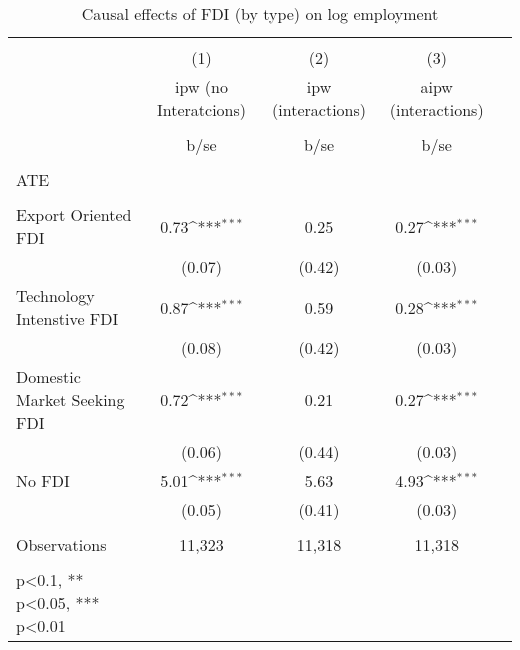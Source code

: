\begin{table}
	\def\sym#1{\ifmmode^{#1}\else\(^{#1}\)\fi}
	\caption{Causal effects of FDI (by type) on log employment}
	\label{4_table1}
	\begin{tabular}{l*{1}{cccc}}
		\hline\hline
		&\multicolumn{4}{c}{}                                        \\
		& (1) & (2) & (3)    \\
		\
		&ipw (no Interatcions) & ipw (interactions) & aipw (interactions)    \\
		\\
		&b/se&b/se& b/se       \\
		\hline
		\\
		ATE \\
		\\
		Export Oriented FDI &       0.73\sym{***} &  0.25  &   0.27\sym{***} \\
		&     (0.07)&     (0.42)&   (0.03)        \\
		Technology Intenstive FDI&       0.87\sym{***}&       0.59 &       0.28\sym{***}\\
		&     (0.08)&     (0.42)& (0.03)          \\
		Domestic Market Seeking FDI&       0.72\sym{***}&       0.21 &      0.27\sym{***}\\
		&     (0.06)&     (0.44)&     (0.03)   \\
		No FDI &       5.01\sym{***}&       5.63 &      4.93\sym{***}\\
		&     (0.05)&     (0.41)&     (0.03)   \\
		\hline
		\\
		Observations        &       11,323 &      11,318      &   11,318                  &            \\
		\hline\hline
		\\
		\small * p<0.1, ** p<0.05, *** p<0.01
	\end{tabular} \\
\end{table}

